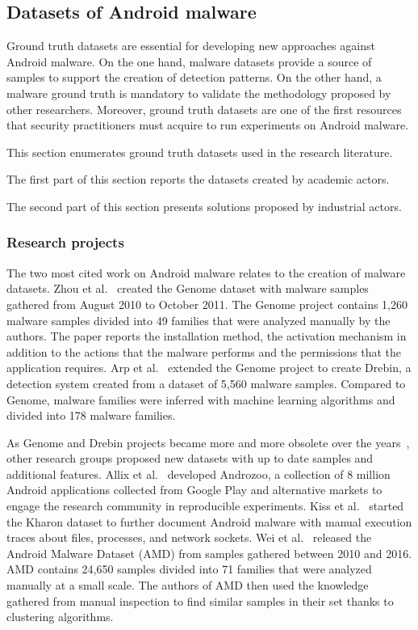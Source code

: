 \subsection{Datasets of Android malware}
Ground truth datasets are essential for developing new approaches against Android malware.
On the one hand, malware datasets provide a source of samples to support the creation of detection patterns.
On the other hand, a malware ground truth is mandatory to validate the methodology proposed by other researchers.
Moreover, ground truth datasets are one of the first resources that security practitioners must acquire to run experiments on Android malware.

This section enumerates ground truth datasets used in the research literature.

The first part of this section reports the datasets created by academic actors.

The second part of this section presents solutions proposed by industrial actors.
\subsubsection{Research projects}
The two most cited work on Android malware relates to the creation of malware datasets.
Zhou et al.~\cite{zhou_dissecting_2012} created the Genome dataset with malware samples gathered from August 2010 to October 2011.
The Genome project contains 1,260 malware samples divided into 49 families that were analyzed manually by the authors.
The paper reports the installation method, the activation mechanism in addition to the actions that the malware performs and the permissions that the application requires.
Arp et al.~\cite{arp_drebin:_2014} extended the Genome project to create Drebin, a detection system created from a dataset of 5,560 malware samples.
Compared to Genome, malware families were inferred with machine learning algorithms and divided into 178 malware families.

As Genome and Drebin projects became more and more obsolete over the years~\cite{wei_deep_2017}, other research groups proposed new datasets with up to date samples and additional features.
Allix et al.~\cite{allix_androzoo:_2016} developed Androzoo, a collection of 8 million Android applications collected from Google Play and alternative markets to engage the research community in reproducible experiments.
Kiss et al.~\cite{kiss_kharon_2016} started the Kharon dataset to further document Android malware with manual execution traces about files, processes, and network sockets.
Wei et al.~\cite{wei_deep_2017} released the Android Malware Dataset (AMD) from samples gathered between 2010 and 2016.
AMD contains 24,650 samples divided into 71 families that were analyzed manually at a small scale.
The authors of AMD then used the knowledge gathered from manual inspection to find similar samples in their set thanks to clustering algorithms.
